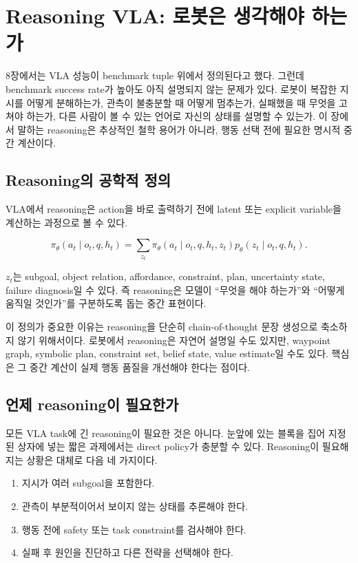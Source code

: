 \chapter{Reasoning VLA: 로봇은 생각해야 하는가}
\label{ch:reasoning_vla}

8장에서는 VLA 성능이 benchmark tuple 위에서 정의된다고 했다. 그런데 benchmark success rate가 높아도 아직 설명되지 않는 문제가 있다. 로봇이 복잡한 지시를 어떻게 분해하는가, 관측이 불충분할 때 어떻게 멈추는가, 실패했을 때 무엇을 고쳐야 하는가, 다른 사람이 볼 수 있는 언어로 자신의 상태를 설명할 수 있는가. 이 장에서 말하는 reasoning은 추상적인 철학 용어가 아니라, 행동 선택 전에 필요한 명시적 중간 계산이다.

\section{Reasoning의 공학적 정의}

VLA에서 reasoning은 action을 바로 출력하기 전에 latent 또는 explicit variable을 계산하는 과정으로 볼 수 있다.

\begin{equation}
  \pi_\theta(a_t \mid o_t,q,h_t)
  =
  \sum_{z_t}
  \pi_\theta(a_t \mid o_t,q,h_t,z_t)
  p_\theta(z_t \mid o_t,q,h_t).
\end{equation}

$z_t$는 subgoal, object relation, affordance, constraint, plan, uncertainty state, failure diagnosis일 수 있다. 즉 reasoning은 모델이 ``무엇을 해야 하는가''와 ``어떻게 움직일 것인가''를 구분하도록 돕는 중간 표현이다.

이 정의가 중요한 이유는 reasoning을 단순히 chain-of-thought 문장 생성으로 축소하지 않기 위해서이다. 로봇에서 reasoning은 자연어 설명일 수도 있지만, waypoint graph, symbolic plan, constraint set, belief state, value estimate일 수도 있다. 핵심은 그 중간 계산이 실제 행동 품질을 개선해야 한다는 점이다.

\section{언제 reasoning이 필요한가}

모든 VLA task에 긴 reasoning이 필요한 것은 아니다. 눈앞에 있는 블록을 집어 지정된 상자에 넣는 짧은 과제에서는 direct policy가 충분할 수 있다. Reasoning이 필요해지는 상황은 대체로 다음 네 가지이다.

\begin{enumerate}
  \item 지시가 여러 subgoal을 포함한다.
  \item 관측이 부분적이어서 보이지 않는 상태를 추론해야 한다.
  \item 행동 전에 safety 또는 task constraint를 검사해야 한다.
  \item 실패 후 원인을 진단하고 다른 전략을 선택해야 한다.
\end{enumerate}

